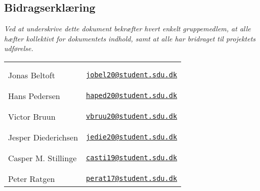 \subsection{Bidragserklæring}
\textit{Ved at underskrive dette dokument bekræfter hvert enkelt gruppemedlem, at alle hæfter kollektivt for dokumentets indhold, samt at alle har bridraget til projektets udførelse.}
\bgroup
    \setlength\tabcolsep{1.2cm}
     \begin{table}[h!]
     \renewcommand{\arraystretch}{1.2}
         \centering
         \begin{tabular}{lr}
             &\\&\\\hline
             Jonas Beltoft         & \href{mailto:jobel20@student.sdu.dk}{\texttt{jobel20@student.sdu.dk}}\\
             &\\&\\\hline
             Hans Pedersen        & \href{mailto:haped20@student.sdu.dk}{\texttt{haped20@student.sdu.dk}}\\
             &\\&\\\hline
             Victor Bruun        & \href{mailto:vbruu20@student.sdu.dk}{\texttt{vbruu20@student.sdu.dk}}\\
             &\\&\\\hline
             Jesper Diederichsen & \href{mailto:jedie20@student.sdu.dk}{\texttt{jedie20@student.sdu.dk}}\\
             &\\&\\\hline
             Casper M. Stillinge   & \href{mailto:casti19@student.sdu.dk}{\texttt{casti19@student.sdu.dk}}\\
             &\\&\\\hline
             Peter Ratgen         & \href{mailto:perat17@student.sdu.dk}{\texttt{perat17@student.sdu.dk}}\\
         \end{tabular}
     \end{table}
\egroup